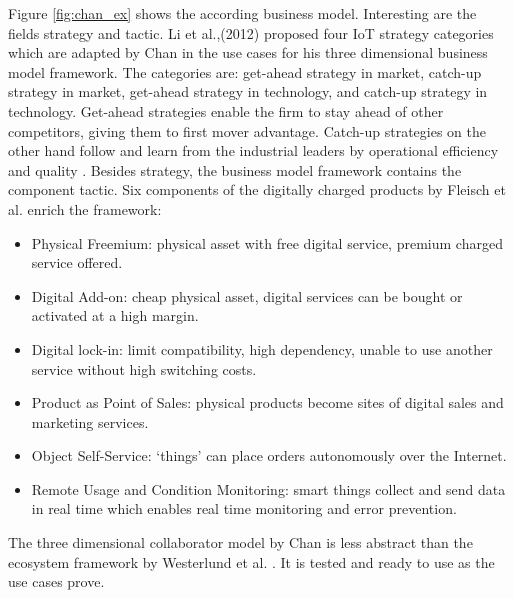 		Figure \ref{fig:chan_ex} shows the according business model. Interesting are the fields strategy and tactic. Li et al.,(2012) \cite{li} proposed four IoT strategy categories which are adapted by Chan in the use cases for his three dimensional business model framework. The categories are: get-ahead strategy in market, catch-up strategy in market, get-ahead strategy in technology, and catch-up strategy in technology. Get-ahead strategies enable the firm to stay ahead of other competitors, giving them to first mover advantage. Catch-up strategies on the other hand follow and learn from the industrial leaders by operational efficiency and quality \cite{chan}.
		Besides strategy, the business model framework contains the component tactic. Six components of the digitally charged products by Fleisch et al.\cite{fleisch} enrich the framework:

		\begin{itemize}
			\item Physical Freemium: physical asset with free digital service, premium charged service offered.
			\item Digital Add-on: cheap physical asset, digital services can be bought or activated at a high margin.
			\item Digital lock-in: limit compatibility, high dependency, unable to use another service without high switching costs.
			\item Product as Point of Sales: physical products become  sites of digital sales and marketing services.
			\item Object Self-Service: `things' can place orders autonomously over the Internet. 
			\item Remote Usage and Condition Monitoring: smart things collect and send data in real time which enables real time monitoring and error prevention.
		\end{itemize}

		The three dimensional collaborator model by Chan is less abstract than the ecosystem framework by Westerlund et al. \cite{westerlund}. It is tested and ready to use as the use cases prove.


